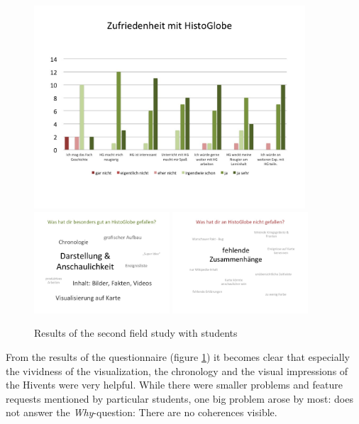 \begin{figure}[ht]
  \begin{center}
    \includegraphics[width=0.9\textwidth]{graphics/test-2-satisfaction.jpg} \\[0.5em]
    \includegraphics[width=0.45\textwidth]{graphics/test-2-tagcloud-pos.jpg}
    \includegraphics[width=0.45\textwidth]{graphics/test-2-tagcloud-neg.jpg}
  \end{center}
  \caption{Results of the second field study with students}
  \label{fig:studyresults-2}
\end{figure}

From the results of the questionnaire (figure \ref{fig:studyresults-2}) it becomes clear that especially the vividness of the visualization, the chronology and the visual impressions of the Hivents were very helpful. While there were smaller problems and feature requests mentioned by particular students, one big problem arose by most: \HG does not answer the \textit{Why}-question: There are no coherences visible.

